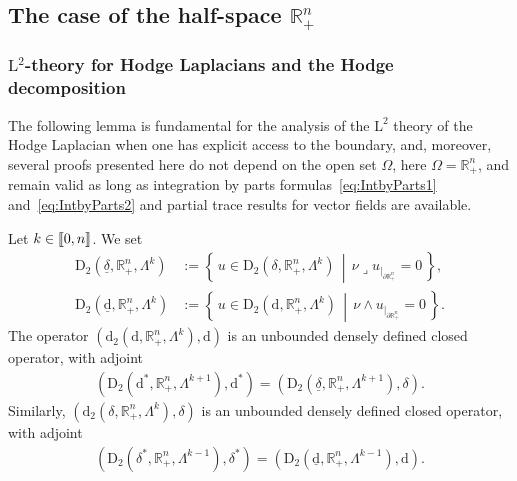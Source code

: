\documentclass[AHL,Unicode,longabstracts,published]{cedram}
\newcommand{\bbR}{\mathbb{R}}
\newcommand{\rmd}{\mathrm{d}}
\newcommand{\rmD}{\mathrm{D}}
\newcommand{\rmL}{\mathrm{L}}
\newcommand{\llbracket}{\mathopen{[\mkern -2.7mu[}}
\newcommand{\rrbracket}{\mathclose{]\mkern -2.7mu]}}
\newcommand{\llb}{\llbracket}
\newcommand{\rrb}{\rrbracket}
\newcommand{\iprod}{\mathbin{\lrcorner}}
\begin{document}
\subsection{The case of the half-space \texorpdfstring{$\bbR^n_+$}{Rn+}}

\subsubsection{\texorpdfstring{$\rmL^2$}{L2}-theory for Hodge Laplacians and the Hodge decomposition}

The following lemma is fundamental for the analysis of the $\rmL^2$ theory of the Hodge Laplacian when one has explicit access to the boundary, and, moreover, several proofs presented here do not depend on the open set $\Omega$, here $\Omega=\bbR^n_+$, and remain valid as long as integration by parts formulas~\eqref{eq:IntbyParts1} and~\eqref{eq:IntbyParts2} and partial trace results for vector fields are available.

\begin{lemm}\label{lem:closdenessNdualityDerivativesL2Rn+}
Let $k\in\llb 0,n\rrb$. We set
\begin{align*}
\rmD_2\left(\underline{\delta},\bbR^n_+,\Lambda^{k}\right) &:=\left\{\,u\in \rmD_2\left(\delta,\bbR^n_+,\Lambda^{k}\right)\,\middle|\, \nu\iprod u_{|_{\partial\bbR^n_+}}=0\,\right\}, \\
\rmD_2\left(\underline{\rmd},\bbR^n_+,\Lambda^{k}\right) &:= \left\{\,u\in \rmD_2\left(\rmd,\bbR^n_+,\Lambda^{k}\right)\,\middle|\, \nu\wedge u_{|_{\partial\bbR^n_+}}=0\,\right\}.
\end{align*}
The operator $(\rmd_2(\rmd,\bbR^n_+,\Lambda^{k}),\rmd)$ is an unbounded densely defined closed operator, with adjoint
\begin{align}\label{eq:L2dualofextderiv.}
\left(\rmD_2\left(\rmd^\ast,\bbR^n_+,\Lambda^{k+1}\right),\rmd^\ast\right)=\left(\rmD_2\left(\underline{\delta},\bbR^n_+,\Lambda^{k+1}\right),\delta\right).
\end{align}
Similarly, $(\rmd_2(\delta,\bbR^n_+,\Lambda^{k}),\delta)$ is an unbounded densely defined closed operator, with adjoint
\begin{align}\label{eq:L2dualofintderiv.}
\left(\rmD_2\left(\delta^\ast,\bbR^n_+,\Lambda^{k-1}\right),\delta^\ast\right)=\left(\rmD_2\left(\underline{\rmd},\bbR^n_+,\Lambda^{k-1}\right),\rmd\right).
\end{align}
\end{lemm}
\end{document}
